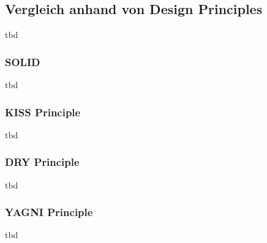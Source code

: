 \subsection{Vergleich anhand von Design Principles}
\color{red}
tbd
\color{black}

\subsubsection{SOLID}
\color{red}
tbd
\color{black}

\subsubsection{KISS Principle}
\color{red}
tbd
\color{black}

\subsubsection{DRY Principle}
\color{red}
tbd
\color{black}

\subsubsection{YAGNI Principle}
\color{red}
tbd
\color{black}
